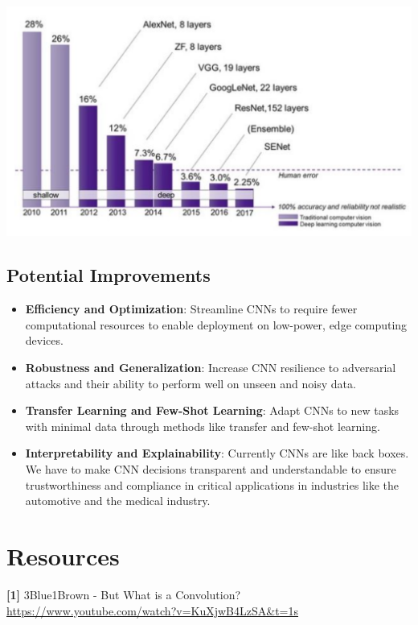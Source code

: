 \documentclass{article}
\begin{document}
        \begin{center}
            \includegraphics[scale=0.35]{images/accuracy.png}
        \end{center}

    \subsection{Potential Improvements}
        \begin{itemize}
            \item \textbf{Efficiency and Optimization}: Streamline CNNs to require fewer computational resources to enable deployment on low-power, edge computing devices.
            \item \textbf{Robustness and Generalization}: Increase CNN resilience to adversarial attacks and their ability to perform well on unseen and noisy data.
            \item \textbf{Transfer Learning and Few-Shot Learning}: Adapt CNNs to new tasks with minimal data through methods like transfer and few-shot learning.
            \item \textbf{Interpretability and Explainability}: Currently CNNs are like back boxes. We have to make CNN decisions transparent and understandable to ensure trustworthiness and compliance in critical applications in industries like the automotive and the medical industry.
        \end{itemize}
    
\section{Resources}
    \textbf{[1]} 3Blue1Brown - But What is a Convolution? \\
    \url{https://www.youtube.com/watch?v=KuXjwB4LzSA&t=1s}
    
\end{document}
